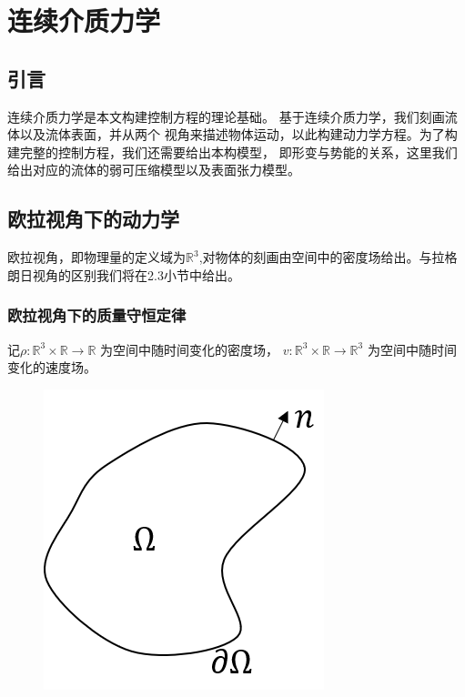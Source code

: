 \chapter{连续介质力学} \label{chap2}
\section{引言}
连续介质力学是本文构建控制方程的理论基础。
基于连续介质力学，我们刻画流体以及流体表面，并从两个
视角来描述物体运动，以此构建动力学方程。为了构建完整的控制方程，我们还需要给出本构模型，
即形变与势能的关系，这里我们给出对应的流体的弱可压缩模型以及表面张力模型。

\section{欧拉视角下的动力学}
欧拉视角，即物理量的定义域为$\mathbb{R}^3$,对物体的刻画由空间中的密度场给出。与拉格朗日视角的区别我们将在2.3小节中给出。

\subsection{欧拉视角下的质量守恒定律}
记$\rho : \mathbb{R}^3 \times \mathbb{R} \rightarrow \mathbb{R}$ 为空间中随时间变化的密度场，
$v : \mathbb{R}^3 \times \mathbb{R} \rightarrow \mathbb{R}^3$ 为空间中随时间变化的速度场。
\begin{figure}[htbp]
    \centering
    \includegraphics[scale=0.5]{./images/image1.png}
    \caption{}
    \label{fig:example}
\end{figure}

